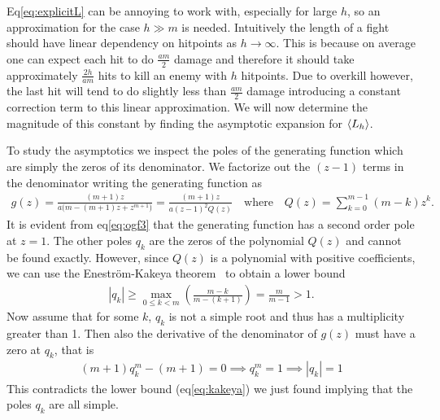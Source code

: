 Eq\ref{eq:explicitL} can be annoying to work with, especially for large $h$, so an approximation for the case $h \gg m$ is needed. Intuitively the length of a fight should have linear dependency on hitpoints as $h \rightarrow \infty$. This is because on average one can expect each hit to do $\frac{am}{2}$ damage and therefore it should take approximately $\frac{2h}{am}$ hits to kill an enemy with $h$ hitpoints. Due to overkill however, the last hit will tend to do slightly less than $\frac{am}{2}$ damage introducing a constant correction term to this linear approximation. We will now determine the magnitude of this constant by finding the asymptotic expansion for $\left\langle L_h \right\rangle$.

To study the asymptotics we inspect the poles of the generating function which are simply the zeros of its denominator. We factorize out the $(z-1)$ terms in the denominator writing the generating function as
\begin{align}
	g(z)
		= \frac{(m+1)z}{a\big(m - (m+1)z + z^{m+1}\big)}
		= \frac{(m+1)z}{{a(z-1)}^2 Q(z)}
	\quad\mbox{where}\quad Q(z) = \sum_{k=0}^{m-1} (m-k) z^k\label{eq:ogf3}.
\end{align}
It is evident from eq\ref{eq:ogf3} that the generating function has a second order pole at $z=1$. The other poles $q_k$ are the zeros of the polynomial $Q(z)$ and cannot be found exactly. However, since $Q(z)$ is a polynomial with positive coefficients, we can use the Eneström-Kakeya theorem~\cite{kakeya} to obtain a lower bound
\begin{align}
	|q_k|
		\geq \max\limits_{0\leq k < m} \left(\frac{m-k}{m-(k+1)}\right)
		= \frac{m}{m-1} > 1\label{eq:kakeya}.
\end{align}
Now assume that for some $k$, $q_k$ is not a simple root and thus has a multiplicity greater than 1. Then also the derivative of the denominator of $g(z)$ must have a zero at $q_k$, that is
\begin{align*}
	(m+1)q_k^m - (m+1) = 0
	\implies q_k^m = 1
	\implies |q_k| = 1
\end{align*}
This contradicts the lower bound (eq\ref{eq:kakeya}) we just found implying that the poles $q_k$ are all simple.

